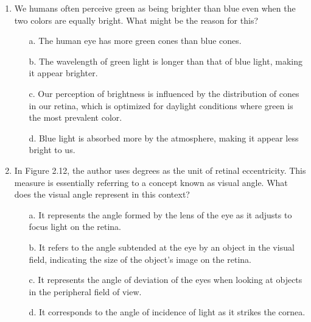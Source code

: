 \documentclass[11pt,letterpaper]{article}
\begin{document}
\begin{enumerate}
    \item We humans often perceive green as being brighter than blue even when the two colors are equally bright. What might be the reason for this?
    \begin{enumerate}
        \item[a.] The human eye has more green cones than blue cones.
        \item[b.] The wavelength of green light is longer than that of blue light, making it appear brighter.
        \item[c.] Our perception of brightness is influenced by the distribution of cones in our retina, which is optimized for daylight conditions where green is the most prevalent color.
        \item[d.] Blue light is absorbed more by the atmosphere, making it appear less bright to us.
    \end{enumerate}

    \item In Figure 2.12, the author uses degrees as the unit of retinal eccentricity. This measure is essentially referring to a concept known as visual angle. What does the visual angle represent in this context?
    \begin{enumerate}
        \item[a.] It represents the angle formed by the lens of the eye as it adjusts to focus light on the retina.
        \item[b.] It refers to the angle subtended at the eye by an object in the visual field, indicating the size of the object's image on the retina.
        \item[c.] It represents the angle of deviation of the eyes when looking at objects in the peripheral field of view.
        \item[d.] It corresponds to the angle of incidence of light as it strikes the cornea.
    \end{enumerate}
\end{enumerate}
\end{document}
